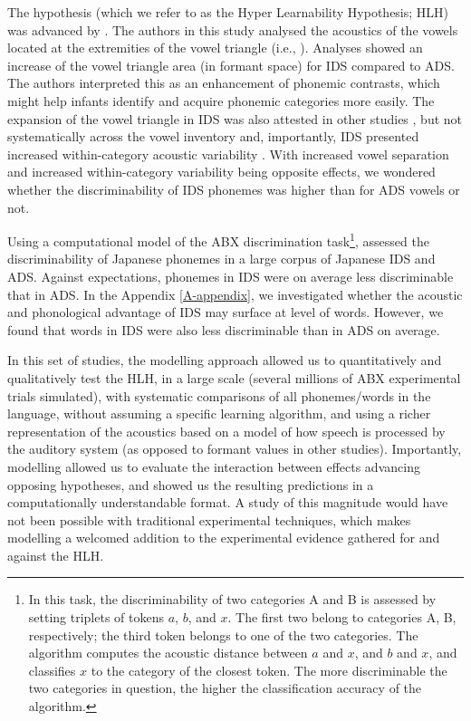 The hypothesis (which we refer to as the Hyper Learnability Hypothesis; HLH) was advanced by \cite{kuhl1997}. The authors in this study analysed the acoustics of the vowels located at the extremities of the vowel triangle (i.e., ). Analyses showed an increase of the vowel triangle area (in formant space) for IDS compared to ADS. The authors interpreted this as an enhancement of phonemic contrasts, which might help infants identify and acquire phonemic categories more easily. The expansion of the vowel triangle in IDS was also attested in other studies \cite{andruski1999, bernstein1984, burnham2002, cristia2014, liu2003, mcmurray2013, uther2007}, but not systematically across the vowel inventory \cite{cristia2014} and, importantly, IDS presented increased within-category acoustic variability \cite{mcmurray2013, cristia2014, kirchhoff2005}. With increased vowel separation and increased within-category variability being opposite effects, we wondered whether the discriminability of IDS phonemes was higher than for ADS vowels or not.

Using a computational model of the ABX discrimination task\footnote{In this task, the discriminability of two categories \textsc{A} and \textsc{B} is assessed by setting triplets of tokens $a$, $b$, and $x$. The first two belong to categories \textsc{A}, \textsc{B}, respectively; the third token belongs to one of the two categories. The algorithm computes the acoustic distance between $a$ and $x$, and $b$ and $x$, and classifies $x$ to the category of the closest token. The more discriminable the two categories in question, the higher the classification accuracy of the algorithm.}, \cite{martin2015} assessed the discriminability of Japanese phonemes in a large corpus of Japanese IDS and ADS. Against expectations, phonemes in IDS were on average less discriminable that in ADS. In the Appendix \ref{A-appendix}, we investigated whether the acoustic and phonological advantage of IDS may surface at level of words. However, we found that words in IDS were also less discriminable than in ADS on average. 

In this set of studies, the modelling approach allowed us to quantitatively and qualitatively test the HLH, in a large scale (several millions of ABX experimental trials simulated), with systematic comparisons of all phonemes/words in the language, without assuming a specific learning algorithm, and using a richer representation of the acoustics based on a model of how speech is processed by the auditory system (as opposed to formant values in other studies). Importantly, modelling allowed us to evaluate the interaction between effects advancing opposing hypotheses, and showed us the resulting predictions in a computationally understandable format. A study of this magnitude would have not been possible with traditional experimental techniques, which makes modelling a welcomed addition to the experimental evidence gathered for and against the HLH.

